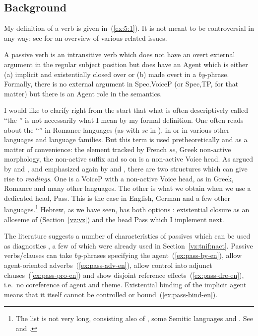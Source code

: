 	\subsection{Background}
My definition of a \textsc{} verb is given in~(\ref{ex:5:1}). It is not meant to be controversial in any way; see \cite{williams15} for an overview of various related issues.
 \begin{exe}
 \ex  \label{ex:5:1}
 \begin{xlist} 
 	\ex  A passive verb is an intransitive verb which does not have an overt external argument in the regular subject position but does have an Agent which is either (a) implicit and existentially closed over or (b) made overt in a \emph{by}-phrase. 
 	\ex  Formally, there is no external argument in Spec,VoiceP (or Spec,TP, for that matter) but there is an Agent role in the semantics. 
 \z
\z 

I would like to clarify right from the start that what is often descriptively called ``the '' is not necessarily what I mean by my formal definition. One often reads about the ``'' in Romance languages (as with \emph{se} in ), in  or in various other languages and language families. But this term is used pretheoretically and as a matter of convenience: the element tracked by French \emph{se}, Greek non-active morphology, the  non-active suffix \citep{lidz01} and so on is a non-active Voice head. As argued by \cite{alexiadoudoron12} and \citet[123]{layering15}, and emphasized again by \cite{spathasetal15} and \cite{kastnerzu17}, there are two structures which can give rise to  \emph{readings}. One is a VoiceP with a non-active Voice head, as in Greek, Romance and many other languages. The other is what we obtain when we use a dedicated  head, Pass. This is the case in English, German and a few other languages.\footnote{The list is not very long, consisting also of , some Semitic languages and . See \cite{klaiman91} and \cite{alexiadoudoron12}.} Hebrew, as we have seen, has both options \citep{alexiadoudoron12}: existential closure as an alloseme of {\vz} (Section~\ref{vz:vz}) and the head Pass which I implement next.

The literature suggests a number of characteristics of passives which can be used as diagnostics \citep{bakeretal89,sichel09,spathasetal15}, a few of which were already used in Section~\ref{vz:tnif:nact}. Passive verbs/clauses can take \emph{by}-phrases specifying the agent~(\ref{ex:pass-by-en}), allow agent-oriented adverbs~(\ref{ex:pass-adv-en}), allow control into adjunct clauses~(\ref{ex:pass-pro-en}) and show disjoint reference effects~(\ref{ex:pass-dre-en}), i.e.~no coreference of agent and theme. Existential binding of the implicit agent means that it itself cannot be controlled or bound~(\ref{ex:pass-bind-en}).


\end{xlist}
\end{exe}
